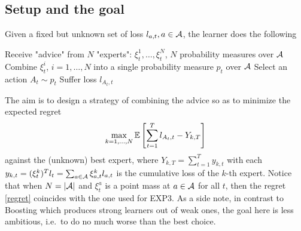 \documentclass[11pt]{article}
\begin{document}
\subsection{Setup and the goal}
Given a fixed but unknown set of loss $l_{a,t},a\in \mathcal{A}$, the learner does the following
\begin{algorithmic}[1]
\STATE Receive "advice" from $N$ "experts": $\xi_t^1,\ldots,\xi_t^N$, $N$ probability measures over $\mathcal{A}$
\STATE Combine $\xi_t^i$, $i=1,\ldots,N$ into a single probability measure $p_t$ over $\mathcal{A}$
\STATE Select an action $A_t\sim p_t$
\STATE Suffer loss $l_{A_t,t}$
\ENDFOR
\end{algorithmic}
The aim is to design a strategy of combining the advice so as to minimize the expected regret
\begin{equation}\label{regret}
\max_{k=1,\ldots,N}\mathbb{E}\left[ \sum_{t=1}^Tl_{A_t,t}-Y_{k,T} \right]
\end{equation}
against the (unknown) best expert, where $Y_{k,T}=\sum_{t=1}^Ty_{k,t}$ with each $y_{k,t}=(\xi_t^k)^Tl_t=\sum_{a\in \mathcal{A}}\xi_{a,t}^kl_{a,t}$ is the cumulative loss of the $k$-th expert. Notice that when $N=\vert \mathcal{A}\vert $ and $\xi_t^a$ is a point mass at $a\in\mathcal{A}$ for all $t$, then the regret \eqref{regret} coincides with the one used for EXP$3$. As a side note, in contrast to Boosting which produces strong learners out of weak ones, the goal here is less ambitious, i.e.~to do no much worse than the best choice.
\end{document}
